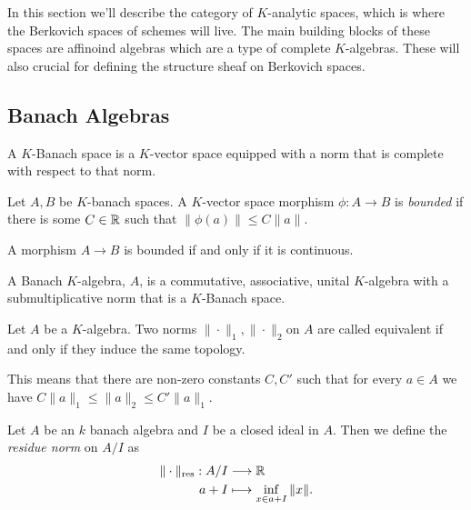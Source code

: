 
In this section we'll describe the category of $K$-analytic spaces, which is where the Berkovich spaces of schemes will live. 
The main building blocks of these spaces are affinoind algebras which are a type of complete $K$-algebras. 
These will also crucial for defining the structure sheaf on Berkovich spaces. 

\subsection{Banach Algebras} \label{sec:banach_algebras}
\begin{definition}
	A $K$-Banach space is a $K$-vector space equipped with a norm that is complete with respect to that norm. 
\end{definition}

\begin{definition}
	Let $A, B$ be $K$-banach spaces. 
	A $K$-vector space morphism $\phi: A \to B$ is \emph{bounded} if there is some $C\in \mathbb{R}$ such that $\|\phi(a)\|\le C \|a\| $. 
\end{definition}

\begin{lemma}
	A morphism $A \to B$ is bounded if and only if it is continuous. 
\end{lemma}

\begin{definition}
	A Banach $K$-algebra, $A$, is a commutative, associative, unital $K$-algebra with a submultiplicative norm that is a $K$-Banach space.
\end{definition}
\begin{definition}
	Let $A$ be a $K$-algebra. 
	Two norms $\|\cdot \|_1, \|\cdot \|_2$on $A$ are called equivalent if and only if they induce the same topology. 

	This means that there are non-zero constants $C, C'$ such that for every $ a\in A$ we have $C\|a\|_1 \le \|a\|_2 \le C'\|a\|_1$. 
\end{definition}

\begin{definition}
	Let $A$ be an $k$ banach algebra and $I$ be a closed ideal in $A$. 
	Then we define the \emph{residue norm} on $A / I$ as 
	\begin{align*}
		\|\cdot \|_\text{res} : A / I &\longrightarrow \mathbb{R} \\
		a + I &\longmapsto \inf_{x \in a + I} \|x\|
	.\end{align*}
\end{definition}

